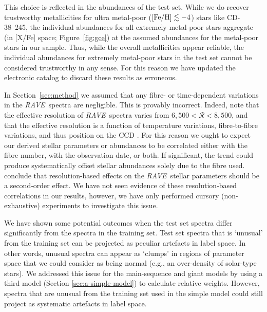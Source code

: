 \documentclass[preprint]{aastex}
\newcommand{\acronym}[1]{{\small{#1}}}
\newcommand{\project}[1]{\textsl{#1}}
\newcommand{\rave}{\project{\acronym{RAVE}}}
\begin{document}
This choice is reflected in the abundances of the test set.  While we do recover
trustworthy metallicities for ultra metal-poor ($[{\rm Fe/H}] \lesssim -4$) stars like 
CD-38~245, the individual abundances for all extremely metal-poor stars aggregate
(in [X/Fe] space; Figure~\ref{fig:gce}) at the assumed abundances for the metal-poor
stars in our sample.  Thus, while the overall metallicities appear reliable, the 
individual abundances for extremely metal-poor stars in the test set cannot be
considered trustworthy in any sense.  For this reason we have updated the electronic
catalog to discard these results as erroneous.


In Section~\ref{sec:method} we assumed that any fibre- or time-dependent variations
in the \rave\ spectra are negligible.  This is provably incorrect. Indeed,
\citet{Kordopatis_2013} note that the effective resolution of \rave\ spectra
varies from $6{,}500 < \mathcal{R} < 8{,}500$, and that the effective 
resolution is a function of temperature variations, fibre-to-fibre variations,
and thus position on the CCD \citep{Steinmetz_2006}. For this reason we ought
to expect our derived stellar parameters or abundances to be correlated either
with the fibre number, with the observation date, or both.  If significant, 
the trend could produce systematically offset stellar abundances solely due to
the fibre used.  \citet{Kordopatis_2013} conclude that resolution-based effects 
on the \rave\ stellar parameters should be a second-order effect. We have not 
seen evidence of these resolution-based correlations in our results, however, 
we have only performed cursory (non-exhaustive) experiments to investigate 
this issue.


We have shown some potential outcomes when the test set spectra differ 
significantly from the spectra in the training set.  Test set spectra that is
`unusual' from the training set can be projected as peculiar artefacts in 
label space.  In other words, unusual spectra can appear as `clumps' in
regions of parameter space that we could consider as being normal (e.g.,
an over-density of solar-type stars).  We addressed this issue for the main-sequence
and giant models by using a third model (Section \ref{sec:a-simple-model}) to
calculate relative weights.  However, spectra that are unusual from the 
training set used in the simple model could still project as systematic 
artefacts in label space.  
\end{document}
